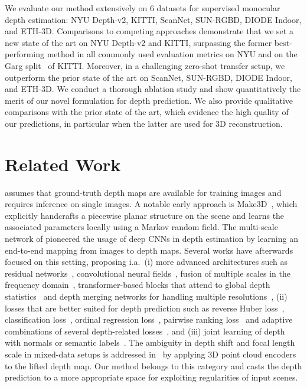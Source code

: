 \documentclass[final]{cvpr}
\newcommand{\PAR}[1]{\vskip2pt \noindent{\bf #1}}
\begin{document}
We evaluate our method extensively on 6 datasets for supervised monocular depth estimation: NYU Depth-v2, KITTI, ScanNet, SUN-RGBD, DIODE Indoor, and ETH-3D. Comparisons to competing approaches demonstrate that we set a new state of the art on NYU Depth-v2 and KITTI, surpassing the former best-performing method in all commonly used evaluation metrics on NYU and on the Garg split~\cite{unsupervised:cnn:single:view:depth} of KITTI. Moreover, in a challenging zero-shot transfer setup, we outperform the prior state of the art on ScanNet, SUN-RGBD, DIODE Indoor, and ETH-3D. We conduct a thorough ablation study and show quantitatively the merit of our novel formulation for depth prediction. We also provide qualitative comparisons with the prior state of the art, which evidence the high quality of our predictions, in particular when the latter are used for 3D reconstruction.


\section{Related Work}
\label{sec:related}

\PAR{Supervised monocular depth estimation} assumes that ground-truth depth maps are available for training images and requires inference on single images. A notable early approach is Make3D~\cite{depth:make3d}, which explicitly handcrafts a piecewise planar structure on the scene and learns the associated parameters locally using a Markov random field. The multi-scale network of \cite{depth:multiscale:network} pioneered the usage of deep CNNs in depth estimation by learning an end-to-end mapping from images to depth maps. Several works have afterwards focused on this setting, proposing i.a.\ (i) more advanced architectures such as residual networks~\cite{depth:frcn}, convolutional neural fields~\cite{structured:attention:crf,depth:convolutional:neural:fields}, fusion of multiple scales in the frequency domain~\cite{depth:fourier:analysis}, transformer-based blocks that attend to global depth statistics~\cite{adabins} and depth merging networks for handling multiple resolutions~\cite{high:resolution:depth:estimation:multi:resolution:merging}, (ii) losses that are better suited for depth prediction such as reverse Huber loss~\cite{depth:frcn}, classification loss~\cite{depth:as:classification}, ordinal regression loss~\cite{deep:ordinal:regression:network}, pairwise ranking loss~\cite{structure:guided:ranking:loss:depth} and adaptive combinations of several depth-related losses~\cite{multi:loss:rebalancing:monocular:depth}, and (iii) joint learning of depth with normals or semantic labels~\cite{depth:normals:labels,geonet:depth:normal,padnet}. The ambiguity in depth shift and focal length scale in mixed-data setups is addressed in~\cite{3d:scene:shape:from:single:image} by applying 3D point cloud encoders to the lifted depth map. Our method belongs to this category and casts the depth prediction to a more appropriate space for exploiting regularities of input scenes.
\end{document}
